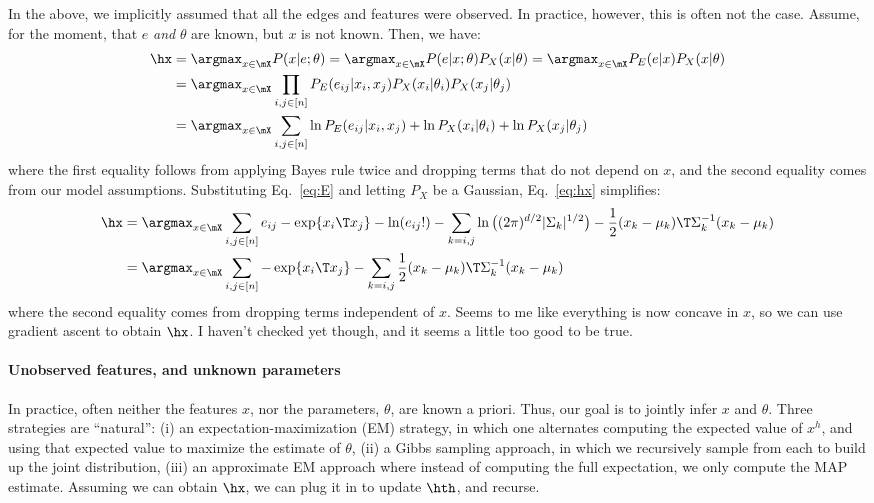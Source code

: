 \documentclass{article}
\begin{document}
In the above, we implicitly assumed that all the edges and features were observed.  In practice, however, this is often not the case.  Assume, for the moment, that $e$ \emph{and} $\theta$ are known, but $x$ is not known.  Then, we have:
\begin{align} \label{eq:hx}
	\hx &= \argmax_{x \in \mX} P(x|e;\theta) = \argmax_{x \in \mX} P(e|x;\theta) P_X(x|\theta) = \argmax_{x \in \mX} 
	 P_E(e|x) P_X(x|\theta) \nonumber \\
	&= \argmax_{x \in \mX} \prod_{i,j \in [n]} P_E(e_{ij}|x_i,x_j) P_X(x_i | \theta_i) P_X(x_j|\theta_j) \nonumber \\
	&= \argmax_{x \in \mX} \sum_{i,j \in [n]} \ln P_E(e_{ij}|x_i,x_j) + \ln P_X(x_i | \theta_i) + \ln  P_X(x_j|\theta_j) 
\end{align}
where the first equality follows from applying Bayes rule twice and dropping terms that do not depend on $x$, and the second equality comes from our model assumptions.  Substituting Eq.~\eqref{eq:E} and letting $P_X$ be a Gaussian, Eq.~\eqref{eq:hx} simplifies:
\begin{align} \label{eq:hx2}
	\hx &= \argmax_{x \in \mX} \sum_{i,j \in [n]} e_{ij} - \exp\{x_i\T x_j\} - \ln (e_{ij}!) - \sum_{k=i,j} \ln \big((2\pi)^{d/2} |\Sigma_k|^{1/2}\big) - \frac{1}{2} (x_k-\mu_k)\T \Sigma_k^{-1} (x_k-\mu_k) \nonumber \\
	&= \argmax_{x \in \mX} \sum_{i,j \in [n]} -\exp\{x_i\T x_j\} - \sum_{k=i,j}\frac{1}{2} (x_k-\mu_k)\T \Sigma_k^{-1} (x_k-\mu_k)
\end{align}
where the second equality comes from dropping terms independent of $x$.  Seems to me like everything is now concave in $x$, so we can use gradient ascent to obtain $\hx$.  I haven't checked yet though, and it seems a little too good to be true.




\paragraph{Unobserved features, and unknown parameters}

In practice, often neither the features $x$, nor the parameters, $\theta$, are known a priori.  Thus, our goal is to jointly infer $x$ and $\theta$.  Three strategies are ``natural'': (i) an expectation-maximization (EM) strategy, in which one alternates computing the expected value of $x^h$, and using that expected value to maximize the estimate of $\theta$, (ii) a Gibbs sampling approach, in which we recursively sample from each to build up the joint distribution, (iii) an approximate EM approach where instead of computing the full expectation, we only compute the MAP estimate.  Assuming we can obtain $\hx$, we can plug it in to update $\hth$, and recurse.
\end{document}
